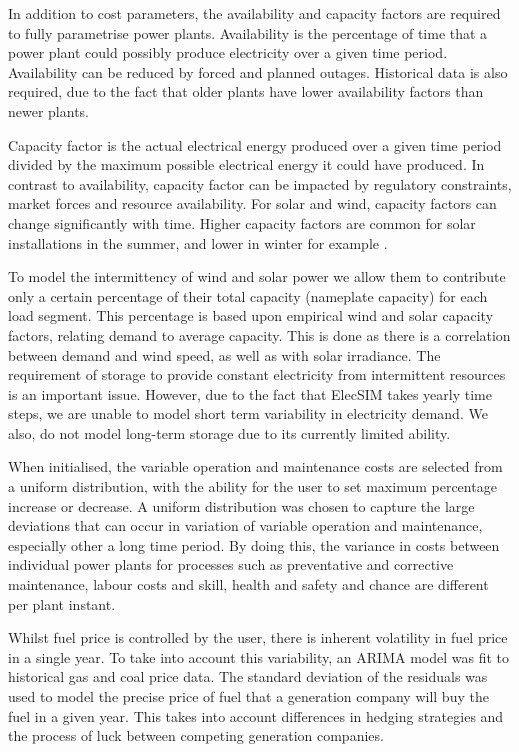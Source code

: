 In addition to cost parameters, the availability and capacity factors are required to fully parametrise power plants. Availability is the percentage of time that a power plant could possibly produce electricity over a given time period. Availability can be reduced by forced and planned outages. Historical data is also required, due to the fact that older plants have lower availability factors than newer plants.

Capacity factor is the actual electrical energy produced over a given time period divided by the maximum possible electrical energy it could have produced. In contrast to availability, capacity factor can be impacted by regulatory constraints, market forces and resource availability. For solar and wind, capacity factors can change significantly with time. Higher capacity factors are common for solar installations in the summer, and lower in winter for example \cite{Stoft2002}. 

To model the intermittency of wind and solar power we allow them to contribute only a certain percentage of their total capacity (nameplate capacity) for each load segment. This percentage is based upon empirical wind and solar capacity factors, relating demand to average capacity. This is done as there is a correlation between demand and wind speed, as well as with solar irradiance. The requirement of storage to provide constant electricity from intermittent resources is an important issue. However, due to the fact that ElecSIM takes yearly time steps, we are unable to model short term variability in electricity demand. We also, do not model long-term storage due to its currently limited ability. 

When initialised, the variable operation and maintenance costs are selected from a uniform distribution, with the ability for the user to set maximum percentage increase or decrease. A uniform distribution was chosen to capture the large deviations that can occur in variation of variable operation and maintenance, especially other a long time period. By doing this, the variance in costs between individual power plants for processes such as preventative and corrective maintenance, labour costs and skill, health and safety and chance are different per plant instant.  

Whilst fuel price is controlled by the user, there is inherent volatility in fuel price in a single year. To take into account this variability, an ARIMA model was fit to historical gas and coal price data. The standard deviation of the residuals was used to model the precise price of fuel that a generation company will buy the fuel in a given year. This takes into account differences in hedging strategies and the process of luck between competing generation companies.


